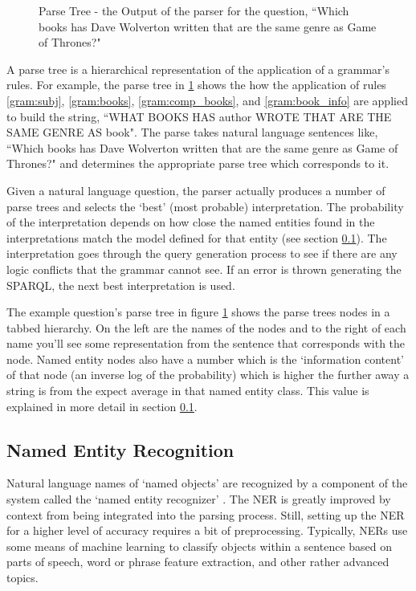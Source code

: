 \documentclass[11pt]{article}
\begin{document}
\begin{figure}[h!]
\caption{Parse Tree - the Output of the parser for the question, 
``Which books has Dave Wolverton written that are the same genre as Game of Thrones?"}
\label{fig:parse}
\end{figure}

A parse tree is a hierarchical representation of the application of a grammar's rules.
For example, the parse tree in \ref{fig:parse} shows the how the application of rules
\ref{gram:subj}, \ref{gram:books}, \ref{gram:comp_books}, and \ref{gram:book_info}
are applied to build the string, 
``WHAT BOOKS HAS author WROTE THAT ARE THE SAME GENRE AS book". The parse takes
natural language sentences like, ``Which books has Dave Wolverton written that
are the same genre as Game of Thrones?" and determines the appropriate parse tree which
corresponds to it.

Given a natural language question, the parser actually produces a number of
parse trees and selects the `best' (most probable) interpretation. The probability
of the interpretation depends on how close the named entities found in 
the interpretations match the model defined for that entity (see section \ref{ner}). 
The interpretation goes through the query generation process to see if there are
any logic conflicts that the grammar cannot see. If an error is thrown generating the
SPARQL, the next best interpretation is used.

The example question's parse tree in figure \ref{fig:parse} shows the parse trees nodes
in a tabbed hierarchy. On the left are the names of the nodes and to
the right of each name you'll see some representation from the sentence that 
corresponds with the node. Named entity nodes also have a number which is the
`information content' of that node (an inverse log of the probability) which is higher
the further away a string is from the expect average in that named entity class.
This value is explained in more detail in section \ref{ner}.

\subsection{Named Entity Recognition}
\label{ner}
Natural language names of `named objects' are recognized by a component of the system
called the `named entity recognizer' \cite{ner1,ner2}. 
The NER is greatly improved by context from being integrated into the parsing process.
Still, setting up the NER for a higher level of accuracy requires a bit of preprocessing.
Typically, NERs use some means of machine learning to classify objects within a
sentence based on parts of speech, word or phrase feature extraction, and other
rather advanced topics\cite{ner1}. 
\end{document}
